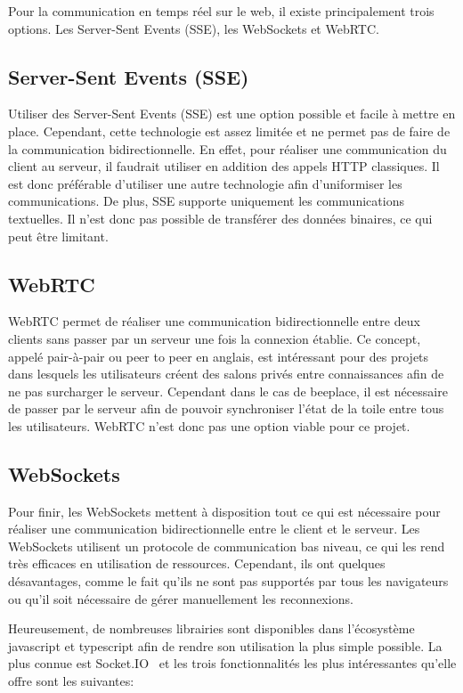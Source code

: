Pour la communication en temps réel sur le web, il existe principalement trois options. Les Server-Sent Events (SSE), les WebSockets et WebRTC.

\subsection{Server-Sent Events (SSE)}
Utiliser des Server-Sent Events (SSE) est une option possible et facile à mettre en place. Cependant, cette technologie est assez limitée et ne permet pas de faire de la communication bidirectionnelle. En effet, pour réaliser une communication du client au serveur, il faudrait utiliser en addition des appels HTTP classiques. Il est donc préférable d'utiliser une autre technologie afin d'uniformiser les communications. De plus, SSE supporte uniquement les communications textuelles. Il n'est donc pas possible de transférer des données binaires, ce qui peut être limitant.

\subsection{WebRTC}
WebRTC permet de réaliser une communication bidirectionnelle entre deux clients sans passer par un serveur une fois la connexion établie. Ce concept, appelé pair-à-pair ou peer to peer en anglais, est intéressant pour des projets dans lesquels les utilisateurs créent des salons privés entre connaissances afin de ne pas surcharger le serveur. Cependant dans le cas de \gls{beeplace}, il est nécessaire de passer par le serveur afin de pouvoir synchroniser l'état de la toile entre tous les utilisateurs. WebRTC n'est donc pas une option viable pour ce projet.

\subsection{WebSockets}
Pour finir, les WebSockets mettent à disposition tout ce qui est nécessaire pour réaliser une communication bidirectionnelle entre le client et le serveur. Les WebSockets utilisent un protocole de communication bas niveau, ce qui les rend très efficaces en utilisation de ressources. Cependant, ils ont quelques désavantages, comme le fait qu'ils ne sont pas supportés par tous les navigateurs ou qu'il soit nécessaire de gérer manuellement les reconnexions.

Heureusement, de nombreuses librairies sont disponibles dans l'écosystème \gls{javascript} et \gls{typescript} afin de rendre son utilisation la plus simple possible. La plus connue est Socket.IO~\cite{socket-io} et les trois fonctionnalités les plus intéressantes qu'elle offre sont les suivantes:

